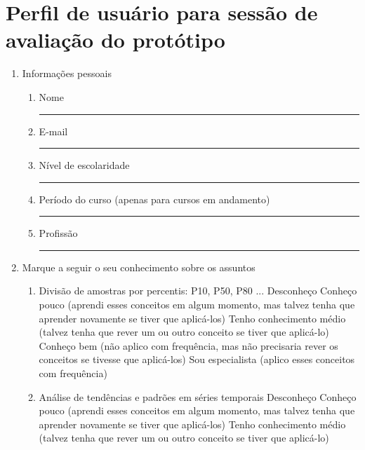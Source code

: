 \newpage

\chapter{Perfil de usuário para sessão de avaliação do protótipo}
\label{chap:profile-form}

\begin{enumerate}
\item Informações pessoais
  \begin{enumerate}
  \item Nome
    \newline \rule[0pt]{300pt}{1pt}
  \item E-mail
    \newline \rule[0pt]{300pt}{1pt}
  \item Nível de escolaridade
    \newline \rule[0pt]{300pt}{1pt}
  \item Período do curso (apenas para cursos em andamento)
    \newline \rule[0pt]{300pt}{1pt}
  \item Profissão
    \newline \rule[0pt]{300pt}{1pt}
  \end{enumerate}
\item Marque a seguir o seu conhecimento sobre os assuntos
  \begin{enumerate}
  \item Divisão de amostras por percentis: P10, P50, P80 ...
    \newline {} Desconheço
    \newline {} Conheço pouco (aprendi esses conceitos em algum momento, mas talvez tenha que aprender novamente se tiver que aplicá-los)
    \newline {} Tenho conhecimento médio (talvez tenha que rever um ou outro conceito se tiver que aplicá-lo)
    \newline {} Conheço bem (não aplico com frequência, mas não precisaria rever os conceitos se tivesse que aplicá-los)
    \newline {} Sou especialista (aplico esses conceitos com frequência)
    \newline 
  \item Análise de tendências e padrões em séries temporais
    \newline {} Desconheço
    \newline {} Conheço pouco (aprendi esses conceitos em algum momento, mas talvez tenha que aprender novamente se tiver que aplicá-los)
    \newline {} Tenho conhecimento médio (talvez tenha que rever um ou outro conceito se tiver que aplicá-lo)
  \end{enumerate}
\end{enumerate}